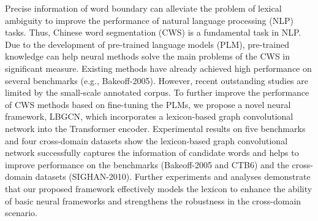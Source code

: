 Precise information of word boundary can alleviate the problem of lexical ambiguity to improve the performance of natural language processing (NLP) tasks. Thus, Chinese word segmentation (CWS) is a fundamental task in NLP. Due to the development of pre-trained language models (PLM), pre-trained knowledge can help neural methods solve the main problems of the CWS in significant measure. Existing methods have already achieved high performance on several benchmarks (e.g., Bakeoff-2005). However, recent outstanding studies are limited by the small-scale annotated corpus. To further improve the performance of CWS methods based on fine-tuning the PLMs, we propose a novel neural framework, LBGCN, which incorporates a lexicon-based graph convolutional network into the Transformer encoder. Experimental results on five benchmarks and four cross-domain datasets show the lexicon-based graph convolutional network successfully captures the information of candidate words and helps to improve performance on the benchmarks (Bakeoff-2005 and CTB6) and the cross-domain datasets (SIGHAN-2010). Further experiments and analyses demonstrate that our proposed framework effectively models the lexicon to enhance the ability of basic neural frameworks and strengthens the robustness in the cross-domain scenario.
